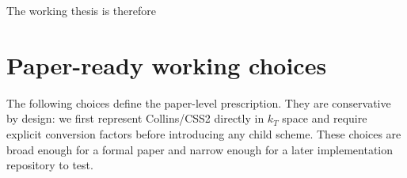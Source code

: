 \documentclass[11pt]{article}
\begin{document}
The working thesis is therefore
\begin{center}
\end{center}


\section{Paper-ready working choices}
\label{sec:v09-choices}

The following choices define the paper-level prescription.  They are conservative by design:
we first represent Collins/CSS2 directly in $k_T$ space and require explicit conversion
factors before introducing any child scheme.  These choices are broad enough for a formal
paper and narrow enough for a later implementation repository to test.
\end{document}
